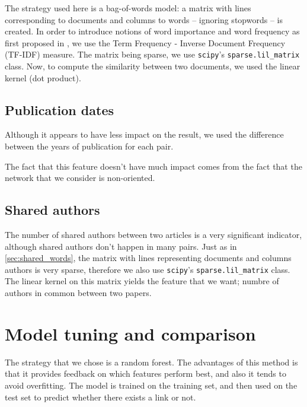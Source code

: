 \documentclass{article}
\newcommand{\code}[1]{\texttt{#1}}
\begin{document}
The strategy used here is a bag-of-words model: a matrix with lines corresponding to documents and columns to words -- ignoring stopwords -- is created.
In order to introduce notions of word importance and word frequency as first proposed in \cite{sparck1972statistical}, we use the Term Frequency - Inverse Document Frequency (TF-IDF) measure. The matrix being sparse, we use \code{scipy}'s \code{sparse.lil\_matrix} class.
Now, to compute the similarity between two documents, we used the linear kernel (dot product).

\subsection{Publication dates}

Although it appears to have less impact on the result, we used the difference between the years of publication for each pair.

The fact that this feature doesn't have much impact comes from the fact that the network that we consider is non-oriented.

\subsection{Shared authors}

The number of shared authors between two articles is a very significant indicator, although shared authors don't happen in many pairs.
Just as in \ref{sec:shared_words}, the matrix with lines representing documents and columns authors is very sparse, therefore we also use \code{scipy}'s \code{sparse.lil\_matrix} class. The linear kernel on this matrix yields the feature that we want; numbre of authors in common between two papers.

\section{Model tuning and comparison}
\label{sec:experiments}

The strategy that we chose is a random forest. The advantages of this method is that it provides feedback on which features perform best, and also it tends to avoid overfitting. The model is trained on the training set, and then used on the test set to predict whether there exists a link or not.







\end{document}
